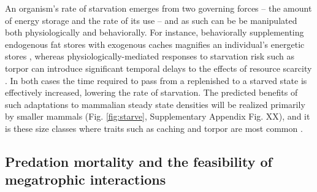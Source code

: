\documentclass[]{rsos}%
\begin{document}
An organism's rate of starvation emerges from two governing forces -- the amount of energy storage and the rate of its use -- and as such can be be manipulated both physiologically and behaviorally.
For instance, behaviorally supplementing endogenous fat stores with exogenous caches magnifies an individual's energetic stores \cite{yeakel2020caching}, whereas physiologically-mediated responses to starvation risk such as torpor can introduce significant temporal delays to the effects of resource scarcity \cite{schubert2010daily}.
In both cases the time required to pass from a replenished to a starved state is effectively increased, lowering the rate of starvation.
The predicted benefits of such adaptations to mammalian steady state densities will be realized primarily by smaller mammals (Fig. \ref{fig:starve}, Supplementary Appendix Fig. XX), and it is these size classes where traits such as caching and torpor are most common \cite{geiser1998evolution,smith1984evolution,yeakel2020caching}. 






\subsection{Predation mortality and the feasibility of megatrophic interactions}
\end{document}

